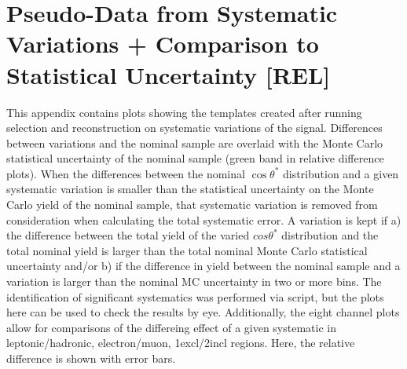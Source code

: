 \clearpage
\section{Pseudo-Data from Systematic Variations + Comparison to Statistical Uncertainty [REL]}
\label{app:systTemplates_rel}
This appendix contains plots showing the templates created after running selection and reconstruction on systematic variations of the \ttbar signal. Differences between variations and the nominal sample are overlaid with the Monte Carlo statistical uncertainty of the nominal sample (green band in relative difference plots). When the differences between the nominal $\cos\theta^*$ distribution and a given systematic variation is smaller than the statistical uncertainty on the Monte Carlo yield of the nominal sample, that systematic variation is removed from consideration when calculating the total systematic error. A variation is kept if a) the difference between the total yield of the varied $cos\theta^*$ distribution and the total nominal yield is larger than the total nominal Monte Carlo statistical uncertainty and/or b) if the difference in yield between the nominal sample and a variation is larger than the nominal MC uncertainty in two or more bins. The identification of significant systematics was performed via script, but the plots here can be used to check the results by eye. Additionally, the eight channel plots allow for comparisons of the differeing effect of a given systematic in leptonic/hadronic, electron/muon, 1excl/2incl regions. Here, the relative difference is shown with error bars.

